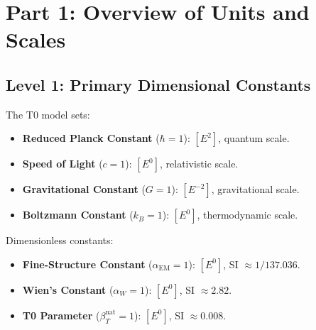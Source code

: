 \documentclass[12pt,a4paper]{article}
\begin{document}
	\section{Part 1: Overview of Units and Scales}
	\label{sec:hierarchy}
	
	\subsection{Level 1: Primary Dimensional Constants}
	\label{subsec:level1}
	
	The T0 model sets:
	\begin{itemize}
		\item \textbf{Reduced Planck Constant} (\(\hbar = 1\)): \([E^2]\), quantum scale.
		\item \textbf{Speed of Light} (\(c = 1\)): \([E^0]\), relativistic scale.
		\item \textbf{Gravitational Constant} (\(G = 1\)): \([E^{-2}]\), gravitational scale.
		\item \textbf{Boltzmann Constant} (\(k_B = 1\)): \([E^0]\), thermodynamic scale.
	\end{itemize}
	
	Dimensionless constants:
	\begin{itemize}
		\item \textbf{Fine-Structure Constant} (\(\alpha_{\text{EM}} = 1\)): \([E^0]\), SI \(\approx 1/137.036\).
		\item \textbf{Wien’s Constant} (\(\alpha_W = 1\)): \([E^0]\), SI \(\approx 2.82\).
		\item \textbf{T0 Parameter} (\(\beta_T^{\text{nat}} = 1\)): \([E^0]\), SI \(\approx 0.008\).
	\end{itemize}
	
\end{document}
